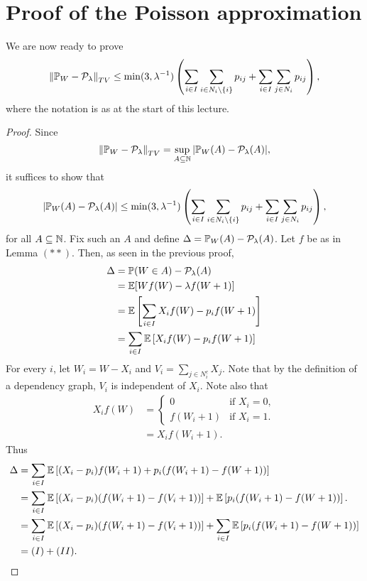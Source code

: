 \section{Proof of the Poisson approximation}
We are now ready to prove 
\[\left\|{\mathbb{P}}_W - {\mathcal{P}}_\lambda\right\|_{TV} \le \min(3,\lambda^{-1})\left(\sum_{i \in I}\sum_{i \in N_i \setminus \{i\}}p_{ij}+\sum_{i \in I}\sum_{j \in N_i}p_{ij}\right), \]
where the notation is as at the start of this lecture.
\begin{proof}
    Since \[\left\|{\mathbb{P}}_W-{\mathcal{P}}_\lambda\right\|_{TV} = \sup_{A \subseteq {{\mathbb N}}}{\left\lvert{\mathbb{P}}_W(A)-{\mathcal{P}}_\lambda(A)\right\rvert},\]
    it suffices to show that 
    \[{\left\lvert{\mathbb{P}}_W(A)-{\mathcal{P}}_\lambda(A)\right\rvert}\le \min(3,\lambda^{-1})\left(\sum_{i \in I}\sum_{i \in N_i \setminus \{i\}}p_{ij}+\sum_{i \in I}\sum_{j \in N_i}p_{ij}\right),\]
    for all $A \subseteq {{\mathbb N}}$. Fix such an $A$ and define $\Delta = {\mathbb{P}}_W(A)-{\mathcal{P}}_\lambda(A)$. Let $f$ be as in Lemma $(**)$. Then, as seen in the previous proof,
    \begin{align*}
        \Delta &= {\mathbb{P}}(W \in A) - {\mathcal{P}}_\lambda(A) \\
        &= {\mathbb{E}}[Wf(W)-\lambda f(W+1)]\\
        &={\mathbb{E}}\left[\sum_{i \in I}X_i f(W)-p_i f(W+1)
            \right]\\
        &=\sum_{i \in I}{\mathbb{E}}\left[X_if(W)-p_i f(W+1)\right]
    \end{align*}
    For every $i$, let $W_i = W-X_i$ and $V_i = \sum_{j \in N_i^c} X_j$. Note that by the definition of a dependency graph, $V_i$ is independent of $X_i$. Note also that 
    \begin{align*}
        X_if(W) &= \begin{cases}
            0 & \text{if } X_i=0,\\
            f(W_i+1)&\text{if } X_i = 1.
        \end{cases}\\
        &=X_i f(W_i+1).
    \end{align*}
    Thus
    \begin{align}\label{1and2}
        \Delta &= \sum_{i \in I}{\mathbb{E}}\left[(X_i-p_i)f(W_i+1)+p_i(f(W_i+1)-f(W+1))\right]\nonumber\\
        &=\sum_{i \in I}{\mathbb{E}}\left[(X_i-p_i)(f(W_i+1)-f(V_i+1))\right]+{\mathbb{E}}\left[p_i(f(W_i+1)-f(W+1))\right].\\
        &=\sum_{i \in I}{\mathbb{E}}\left[(X_i-p_i)(f(W_i+1)-f(V_i+1))\right]+\sum_{i\in I}{\mathbb{E}}\left[p_i(f(W_i+1)-f(W+1))\right]\nonumber \\
        &=(I)+(II).\nonumber
    \end{align}

\end{proof}
